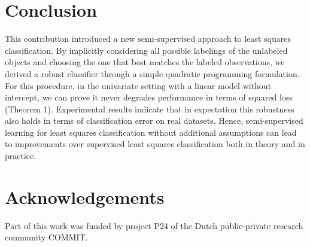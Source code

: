 \documentclass{elsarticle}
\begin{document}


\section{Conclusion}
This contribution introduced a new semi-supervised approach to least squares classification. By implicitly considering all possible labelings of the unlabeled objects and choosing the one that best matches the labeled observations, we derived a robust classifier through a simple quadratic programming formulation. For this procedure, in the univariate setting with a linear model without intercept, we can prove it never degrades performance in terms of squared loss (Theorem 1). Experimental results indicate that in expectation this robustness also holds in terms of classification error on real datasets. Hence, semi-supervised learning for least squares classification without additional assumptions can lead to improvements over supervised least squares classification both in theory and in practice.

\section*{Acknowledgements}
Part of this work was funded by project P24 of the Dutch public-private research community COMMIT.

\end{document}
